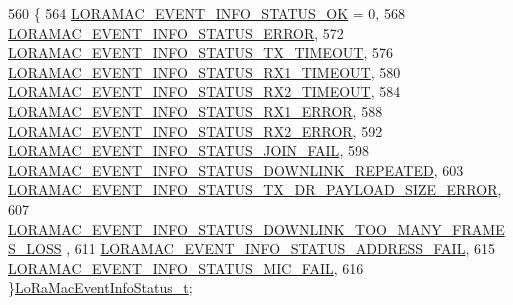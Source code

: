 \begin{DoxyCode}
560 \{
564     \mbox{\hyperlink{group___l_o_r_a_m_a_c_gga3c4e7a774e25faf1606f577ee5e7d201aa5e3d1c382c8473a1095b56067aea3f4}{LORAMAC\_EVENT\_INFO\_STATUS\_OK}} = 0,
568     \mbox{\hyperlink{group___l_o_r_a_m_a_c_gga3c4e7a774e25faf1606f577ee5e7d201a613ed77c0e8416a512224fffdbfdf6c1}{LORAMAC\_EVENT\_INFO\_STATUS\_ERROR}},
572     \mbox{\hyperlink{group___l_o_r_a_m_a_c_gga3c4e7a774e25faf1606f577ee5e7d201a0c2eb197e4102e139b43c01e806fa538}{LORAMAC\_EVENT\_INFO\_STATUS\_TX\_TIMEOUT}},
576     \mbox{\hyperlink{group___l_o_r_a_m_a_c_gga3c4e7a774e25faf1606f577ee5e7d201ab79a8aa20783ae5825ab8488d66a77cc}{LORAMAC\_EVENT\_INFO\_STATUS\_RX1\_TIMEOUT}},
580     \mbox{\hyperlink{group___l_o_r_a_m_a_c_gga3c4e7a774e25faf1606f577ee5e7d201a743858a21ae7cb162abc9acaa62cd4df}{LORAMAC\_EVENT\_INFO\_STATUS\_RX2\_TIMEOUT}},
584     \mbox{\hyperlink{group___l_o_r_a_m_a_c_gga3c4e7a774e25faf1606f577ee5e7d201a7bea16ca3ce17932dd5ee3558fdd0ed1}{LORAMAC\_EVENT\_INFO\_STATUS\_RX1\_ERROR}},
588     \mbox{\hyperlink{group___l_o_r_a_m_a_c_gga3c4e7a774e25faf1606f577ee5e7d201afe9be38729233485ea6edd190eaa8716}{LORAMAC\_EVENT\_INFO\_STATUS\_RX2\_ERROR}},
592     \mbox{\hyperlink{group___l_o_r_a_m_a_c_gga3c4e7a774e25faf1606f577ee5e7d201af42941643347e10f0e5a01c324bf6170}{LORAMAC\_EVENT\_INFO\_STATUS\_JOIN\_FAIL}},
598     \mbox{\hyperlink{group___l_o_r_a_m_a_c_gga3c4e7a774e25faf1606f577ee5e7d201aaae47a8316ae996d506323e0e6613b9b}{LORAMAC\_EVENT\_INFO\_STATUS\_DOWNLINK\_REPEATED}},
603     \mbox{\hyperlink{group___l_o_r_a_m_a_c_gga3c4e7a774e25faf1606f577ee5e7d201a6e7b21fbf0358f3438f2de0fc3fdd866}{LORAMAC\_EVENT\_INFO\_STATUS\_TX\_DR\_PAYLOAD\_SIZE\_ERROR}},
607     \mbox{\hyperlink{group___l_o_r_a_m_a_c_gga3c4e7a774e25faf1606f577ee5e7d201a4a75f7744209239bb80e6af142d0249d}{LORAMAC\_EVENT\_INFO\_STATUS\_DOWNLINK\_TOO\_MANY\_FRAMES\_LOSS}}
      ,
611     \mbox{\hyperlink{group___l_o_r_a_m_a_c_gga3c4e7a774e25faf1606f577ee5e7d201af141bb217ba31a2dc7d3cc128a13de10}{LORAMAC\_EVENT\_INFO\_STATUS\_ADDRESS\_FAIL}},
615     \mbox{\hyperlink{group___l_o_r_a_m_a_c_gga3c4e7a774e25faf1606f577ee5e7d201a43bdb9277722c567c81539fd175a7a63}{LORAMAC\_EVENT\_INFO\_STATUS\_MIC\_FAIL}},
616 \}\mbox{\hyperlink{group___l_o_r_a_m_a_c_gac6ffc346a4c767f7a743c87a686c51b4}{LoRaMacEventInfoStatus\_t}};
\end{DoxyCode}
\mbox{\label{group___l_o_r_a_m_a_c_ga5e02f214e1a4b8578c415045367c0a11}} 
